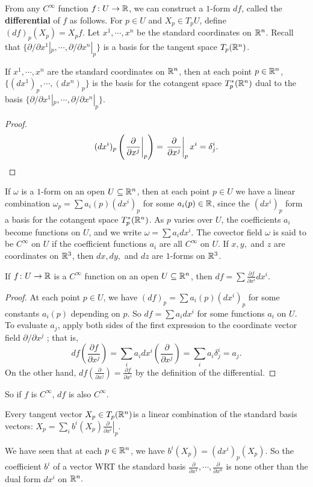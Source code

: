 From any $C^{\infty}$ function $f\colon U \to \mathbb{R}$, we can construct a $1$-form $df$, called the \textbf{differential} of $f$ as follows. For $p\in U$ and $X_p \in T_p U$, define $(df)_p(X_p)=X_pf.$ Let $x^1,\cdots ,x^n $ be the standard coordinates on $\mathbb{R}^n $. Recall that $\{\partial /\partial x^1 |_p,\cdots ,\partial /\partial x^n |_p\} $ is a basis for the tangent space $T_p(\mathbb{R}^n )$.
\begin{prop}
If $x^1,\cdots ,x^n $ are the standard coordinates on $\mathbb{R}^n $, then at each point $p \in \mathbb{R}^n $, $\{(dx^1)_p,\cdots ,(dx^n )_p\} $ is the basis for the cotangent space $T_p^*(\mathbb{R}^n )$ dual to the basis $\{\partial /\partial x^1|_p,\cdots ,\partial /\partial x^n |_p\}$.
\end{prop}
\begin{proof}
    \[
        (dx^i )_p\left( \left. \frac{\partial }{\partial x^j} \right|_p  \right) = \left. \frac{\partial }{\partial x^j} \right| _p x^i =\delta_j ^i .\qedhere
    \] 
\end{proof}
If $\omega$ is a $1$-form on an open $U \subseteq \mathbb{R}^n $, then at each point $p \in U$ we have a linear combination $\omega_p=\sum a_i (p)(dx^i )_p$ for some $a_i (p)\in \mathbb{R}$, since the $(dx^i )_p$ form a basis for the cotangent space $T_p^*(\mathbb{R}^n )$. As $p$ varies over $U$, the coefficients $a_i $ become functions on $U$, and we write $\omega = \sum a_i dx^i $. The covector field $\omega$ is said to be $C^{\infty}$ on $U$ if the coefficient functions $a_i $ are all $C^{\infty}$ on $U$. If $x,y,$ and $z$ are coordinates on $\mathbb{R}^3$, then $dx,dy,$ and $dz$ are $1$-forms on $\mathbb{R}^3$.
\begin{prop}
    If $f \colon U \to \mathbb{R}$ is a $C^{\infty}$ function on an open $U\subseteq \mathbb{R}^n $, then $df = \sum \frac{\partial f}{\partial x^i }dx^i $.
\end{prop}
\begin{proof}
    At each point $p \in U$, we have $(df)_p=\sum a_i (p)(dx^i )_p$ for some constants $a_i (p)$ depending on $p$. So $df=\sum a_i dx^i $ for some functions $a_i $ on $U$. To evaluate $a_j $, apply both sides of the first expression to the coordinate vector field $\partial /\partial x^j$ ; that is, \[
        df\left( \frac{\partial f}{\partial x^j} \right) =\sum_i a_i dx^i \left( \frac{\partial }{\partial x^j} \right) =\sum_i a_i \delta_j ^i =a_j .
    \] On the other hand, $df \left( \frac{\partial }{\partial x^j} \right) =\frac{\partial f}{\partial x^i }$ by the definition of the differential.
\end{proof}
So if $f$ is $C^{\infty}$, $df$ is also $C^{\infty}$.
\begin{example}
    Every tangent vector $X_p \in T_p(\mathbb{R}^n )$is a linear combination of the standard basis vectors: $X_p=\sum _i b^i (X_p)\left. \frac{\partial }{\partial x^i } \right| _p$.
\end{example}
We have seen that at each $p \in \mathbb{R}^n $, we have $b^i (X_p)=(dx^i )_p (X_p)$. So the coefficient $b^i $ of a vector WRT the standard basis $\frac{\partial }{\partial x^1},\cdots ,\frac{\partial }{\partial x^n}$ is none other than the dual form $dx^i $ on $\mathbb{R}^n .$
